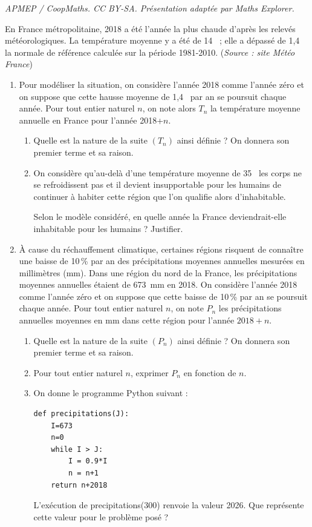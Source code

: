 \documentclass[10pt]{article}
\providecommand{\np}[2][]{{#2~#1}}
\begin{document}
\noindent\textit{APMEP / CoopMaths. CC BY-SA. Présentation adaptée par Maths Explorer.}\par\medskip
\medskip

En France métropolitaine, 2018 a été l'année la plus chaude d'après les relevés météorologiques. La température moyenne y a été de 14~\textcelsius{} ; elle a dépassé de 1,4~\textcelsius{} la normale de référence calculée sur la période 1981-2010. (\emph{Source : site Météo France})

\medskip

\begin{enumerate}
\item Pour modéliser la situation, on considère l'année 2018 comme l'année zéro et on suppose que cette hausse moyenne de 1,4~\textcelsius{} par an se poursuit chaque année. Pour tout entier naturel $n$, on note alors $T_n$ la température moyenne annuelle en France pour l'année 2018+$n$.
	\begin{enumerate}
		\item Quelle est la nature de la suite $\left(T_n\right)$ ainsi définie ? On donnera son premier terme et sa raison.
		\item On considère qu'au-delà d'une température moyenne de 35~\textcelsius{} les corps ne se refroidissent pas et il devient insupportable pour les humains de continuer à habiter cette région que l'on qualifie alors d'inhabitable.

Selon le modèle considéré, en quelle année la France deviendrait-elle inhabitable pour les humains ? Justifier.
	\end{enumerate}
\item À cause du réchauffement climatique, certaines régions risquent de connaître une baisse de 10\,\% par an des précipitations moyennes annuelles mesurées en millimètres (mm). Dans une région du nord de la France, les précipitations moyennes annuelles étaient de \np[mm]{673}  en 2018. On considère l'année 2018 comme l'année zéro et on suppose que cette baisse de 10\,\% par an se poursuit chaque année. Pour tout entier naturel $n$, on note $P_n$ les précipitations annuelles moyennes en mm dans cette région pour l'année $2018+n$.
	\begin{enumerate}
		\item  Quelle est la nature de la suite $\left(P_n\right)$ ainsi définie ? On donnera son premier terme et sa raison.
		\item Pour tout entier naturel $n$, exprimer $P_n$ en fonction de $n$.
		\item On donne le programme Python suivant :

\begin{lstlisting}[style=python]
def precipitations(J):
	I=673
	n=0
	while I > J:
		I = 0.9*I
		n = n+1
	return n+2018
\end{lstlisting}

L'exécution de \og precipitations(300) \fg{} renvoie la valeur 2026. Que représente cette valeur pour le problème posé ?
	\end{enumerate}
\end{enumerate}

\vspace{0,5cm}
\end{document}
